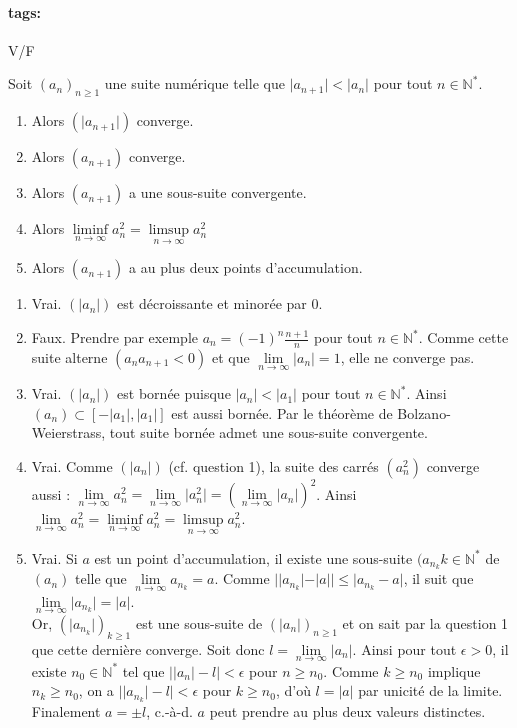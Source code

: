 \documentclass[12pt]{article}
\newcommand*{\xfield}[1]{\begin{mdframed}\centering #1\end{mdframed}\bigskip}
\newenvironment{note}{}{}
\newcommand*{\tags}[1]{\paragraph{tags: }#1}
\begin{document}
\begin{note}
\tags{V/F}
	\xfield{Soit $(a_n)_{n\ge 1}$ une suite numérique telle que $\vert a_{n+1} \vert < \vert a_n \vert$ pour tout $n \in \mathbb{N}^*$.\\
	\begin{enumerate}
		\item Alors $(\vert a_{n+1} \vert )$ converge.
		\item Alors $(a_{n+1})$ converge.
		\item Alors $(a_{n+1})$ a une sous-suite convergente.
		\item Alors $\liminf\limits_{n \to \infty}a_n^2 = \limsup\limits_{n \to \infty}a_n^2 $
		\item Alors $(a_{n+1})$ a au plus deux points d'accumulation.
	\end{enumerate} }
	\xfield{\begin{enumerate}
		\item Vrai. $(\vert a_n \vert)$ est décroissante et minorée par 0.
		\item Faux. Prendre par exemple $a_n = (-1)^n \frac{n+1}{n}$ pour tout $n \in \mathbb{N}^*$. Comme cette suite alterne $(a_na_{n+1} < 0)$ et que $\lim\limits_{n \to \infty} \vert a_n \vert =1$, elle ne converge pas.
		\item Vrai. $(\vert a_n \vert)$ est bornée puisque $\vert a_n \vert < \vert a_1 \vert$ pour tout $n \in \mathbb{N}^*$. Ainsi $(a_n) \subset [-\vert a_1\vert,\vert a_1 \vert]$ est aussi bornée. Par le théorème de Bolzano-Weierstrass, tout suite bornée admet une sous-suite convergente.
		\item Vrai. Comme $(\vert a_n \vert)$ (cf. question 1), la suite des carrés $(a_n^2)$ converge aussi : $\lim\limits_{n \to \infty}a_n^2 = \lim\limits_{n \to \infty}\vert a_n^2\vert = \left(\lim\limits_{n \to \infty}\vert a_n\vert\right)^2$. Ainsi $\lim\limits_{n \to \infty}a_n^2 = \liminf\limits_{n \to \infty}a_n^2 = \limsup\limits_{n \to \infty}a_n^2$.
		\item Vrai. Si $a$ est un point d'accumulation, il existe une sous-suite $(a_{n_{k}}k\in \mathbb{N}^*$ de $(a_n)$ telle que $\lim\limits_{n \to \infty} a_{n_{k}} =a$. Comme $\big| \vert a_{n_{k}}\vert - \vert a\vert\big| \le \vert a_{n_{k}} -a\vert$, il suit que $\lim\limits_{n \to \infty} \vert a_{n_{k}} \vert =\vert a\vert$.\\
		Or, $(\vert a_{n_{k}}\vert)_{k \ge 1}$ est une sous-suite de $(\vert a_n\vert)_{n\ge 1}$ et on sait par la question 1 que cette dernière converge. Soit donc $l = \lim\limits_{n \to \infty} \vert a_n \vert$. Ainsi pour tout $\epsilon > 0$, il existe $n_0 \in \mathbb{N}^*$ tel que $\big| \vert a_n\vert - l \big| < \epsilon$ pour $n \ge n_0$. Comme $k \ge n_0$ implique $n_k \ge n_0$, on a $\big| \vert a_{n_{k}}\vert - l \big| < \epsilon$ pour $k \ge n_0$, d'où $l = \vert a\vert$ par unicité de la limite. Finalement $a = \pm l$, c.-à-d. $a$ peut prendre au plus deux valeurs distinctes. 
	\end{enumerate} }
\end{note}
\end{document}
